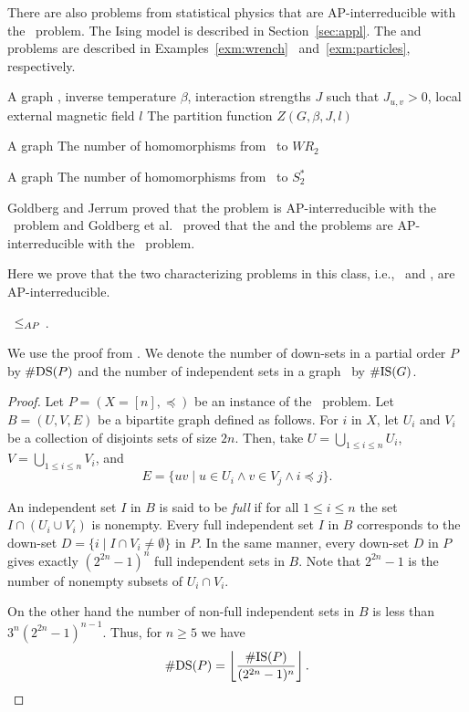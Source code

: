 There are also problems from statistical physics that are AP-interreducible with the \cbis\
problem. The Ising model is described in Section~\ref{sec:appl}.
The \pname{\#2-Wrench-Coloring}
and  problems are described in Examples~\ref{exm:wrench}~
and~\ref{exm:particles}, respectively.

{A graph \mG, inverse temperature \(\beta\), interaction strengths \(J\) such that
\(J_{u,v} > 0\), local external magnetic field \(l\)}
{The partition function \(Z(G,\beta,J,l)\)}

{A graph \mG}
{The number of homomorphisms from \mG\ to \(WR_2\)}

{A graph \mG}
{The number of homomorphisms  from \mG\ to \(S^*_2\)}

Goldberg and Jerrum \cite{Goldberg2007} proved that the  problem 
is AP-interreducible with the \cbis\ problem and 
Goldberg et al.~\cite{Leslie03} proved that the  and
the \pname{\#2-Particles-WR-Configs} problems are  AP-interreducible with the \cbis\ problem.

Here we prove that the two characterizing problems in this class, i.e., \cbis\ and \cdsp,
are AP-interreducible.
\begin{lemma} \label{lem:dstobis}
\cdsp\ \(\le_{AP}\) \cbis\@.
\end{lemma}

We use the proof from \cite{counting}\@. We denote the number of down-sets in a partial order 
\(P\) by \(\#\mathrm{DS}(P)\) and the number of independent sets in a graph \mG\ by
\(\#\mathrm{IS}(G)\)\@.
\begin{proof}
Let \(P=(X=[n],\preceq)\) be an instance of the \cdsp\ problem. 
Let \(B=(U,V,E)\) be a bipartite graph defined as follows.
For \(i\) in \(X\), let \(U_i\) and \(V_i\) be a collection of disjoints sets of
size \(2n\)\@. Then, take \(U=\bigcup_{1 \le i \le n} U_i\), \(V=\bigcup_{1 \le i\le n} V_i\), and
\[E = \{uv \mid u \in U_i \land v \in V_j \land i \preceq j\}.\]

An independent set \(I\) in \(B\) is said to be \emph{full} if for all \(1 \le i \le n\)
the set \(I\cap (U_i \cup V_i)\) is nonempty. Every full independent set \(I\) in \(B\)
corresponds to the down-set \(D=\{i \mid I \cap V_i \neq \emptyset\}\) in \(P\)\@.
In the same manner, every down-set \(D\) in \(P\) gives exactly \((2^{2n}-1)^n\) full independent
sets in \(B\)\@. Note that \(2^{2n}-1\) is the number of nonempty subsets of \(U_i \cap V_i\)\@.

On the other hand the number of non-full independent sets in \(B\) is less than
\(3^n(2^{2n}-1)^{n-1}\)\@. Thus, for \(n\ge 5\) we have 
\[\#\mathrm{DS}(P) = \left\lfloor\frac{\#\mathrm{IS}(P)}{(2^{2n}-1)^n} \right\rfloor .\]
\end{proof}

